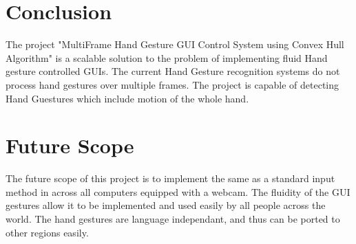 \documentclass[11pt]{report}
\begin{document}
\chapter{Conclusion}

    The project "MultiFrame Hand Gesture GUI Control System using Convex Hull Algorithm" is a scalable solution
    to the problem of implementing fluid Hand gesture controlled GUIs. The current Hand Gesture recognition
    systems do not process hand gestures over multiple frames. The project is capable of detecting Hand Guestures
    which include motion of the whole hand.


\chapter{Future Scope}

The future scope of this project is to implement the same as a standard input method in across all computers
equipped with a webcam. The fluidity of the GUI gestures allow it to be implemented and used easily by 
all people across the world. The hand gestures are language independant, and thus can be ported to other regions easily.

   
\end{document}
